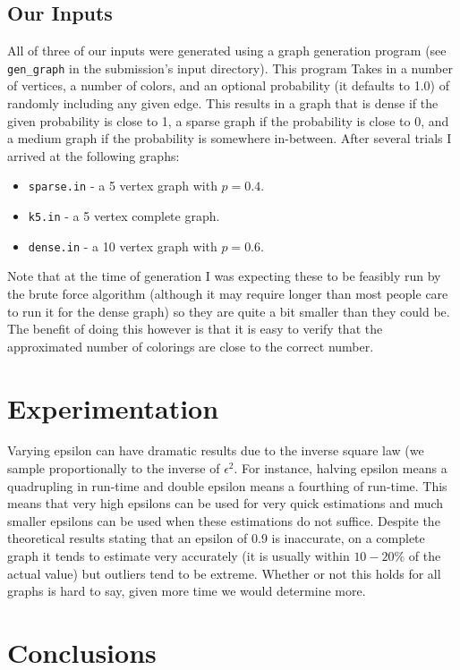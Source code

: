 \documentclass[14]{article}
\begin{document}
\subsection{Our Inputs}
All of three of our inputs were generated using a graph generation program (see \texttt{gen\_graph} in the submission's input directory). This program Takes in a number of vertices, a number of colors, and an optional probability (it defaults to 1.0) of randomly including any given edge. This results in a graph that is dense if the given probability is close to 1, a sparse graph if the probability is close to 0, and a medium graph if the probability is somewhere in-between. After several trials I arrived at the following graphs:
\begin{itemize}
\item \texttt{sparse.in} - a 5 vertex graph with $p=0.4$.
\item \texttt{k5.in} - a 5 vertex complete graph.
\item \texttt{dense.in} - a 10 vertex graph with $p=0.6$.
\end{itemize}
Note that at the time of generation I was expecting these to be feasibly run by the brute force algorithm (although it may require longer than most people care to run it for the dense graph) so they are quite a bit smaller than they could be. The benefit of doing this however is that it is easy to verify that the approximated number of colorings are close to the correct number.
\section{Experimentation}
Varying epsilon can have dramatic results due to the inverse square law (we sample proportionally to the inverse of $\epsilon^2$. For instance, halving epsilon means a quadrupling in run-time and double epsilon means a fourthing of run-time. This means that very high epsilons can be used for very quick estimations and much smaller epsilons can be used when these estimations do not suffice. Despite the theoretical results stating that an epsilon of 0.9 is inaccurate, on a complete graph it tends to estimate very accurately (it is usually within $10-20\%$ of the actual value) but outliers tend to be extreme. Whether or not this holds for all graphs is hard to say, given more time we would determine more.
\section{Conclusions}
\end{document}
